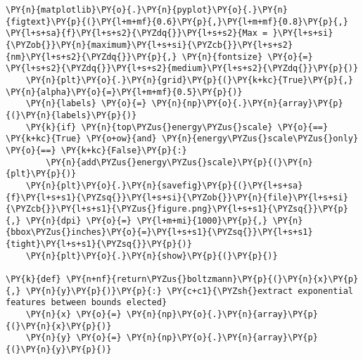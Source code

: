 \begin{tcolorbox}[breakable, size=fbox, boxrule=1pt, pad at break*=1mm,colback=cellbackground, colframe=cellborder]
\begin{Verbatim}[commandchars=\\\{\}]
    \PY{n}{matplotlib}\PY{o}{.}\PY{n}{pyplot}\PY{o}{.}\PY{n}{figtext}\PY{p}{(}\PY{l+m+mf}{0.6}\PY{p}{,}\PY{l+m+mf}{0.8}\PY{p}{,} \PY{l+s+sa}{f}\PY{l+s+s2}{\PYZdq{}}\PY{l+s+s2}{Max = }\PY{l+s+si}{\PYZob{}}\PY{n}{maximum}\PY{l+s+si}{\PYZcb{}}\PY{l+s+s2}{nm}\PY{l+s+s2}{\PYZdq{}}\PY{p}{,} \PY{n}{fontsize} \PY{o}{=} \PY{l+s+s2}{\PYZdq{}}\PY{l+s+s2}{medium}\PY{l+s+s2}{\PYZdq{}}\PY{p}{)}
    \PY{n}{plt}\PY{o}{.}\PY{n}{grid}\PY{p}{(}\PY{k+kc}{True}\PY{p}{,} \PY{n}{alpha}\PY{o}{=}\PY{l+m+mf}{0.5}\PY{p}{)}
    \PY{n}{labels} \PY{o}{=} \PY{n}{np}\PY{o}{.}\PY{n}{array}\PY{p}{(}\PY{n}{labels}\PY{p}{)}
    \PY{k}{if} \PY{n}{top\PYZus{}energy\PYZus{}scale} \PY{o}{==} \PY{k+kc}{True} \PY{o+ow}{and} \PY{n}{energy\PYZus{}scale\PYZus{}only} \PY{o}{==} \PY{k+kc}{False}\PY{p}{:}
        \PY{n}{add\PYZus{}energy\PYZus{}scale}\PY{p}{(}\PY{n}{plt}\PY{p}{)}
    \PY{n}{plt}\PY{o}{.}\PY{n}{savefig}\PY{p}{(}\PY{l+s+sa}{f}\PY{l+s+s1}{\PYZsq{}}\PY{l+s+si}{\PYZob{}}\PY{n}{file}\PY{l+s+si}{\PYZcb{}}\PY{l+s+s1}{\PYZus{}figure.png}\PY{l+s+s1}{\PYZsq{}}\PY{p}{,} \PY{n}{dpi} \PY{o}{=} \PY{l+m+mi}{1000}\PY{p}{,} \PY{n}{bbox\PYZus{}inches}\PY{o}{=}\PY{l+s+s1}{\PYZsq{}}\PY{l+s+s1}{tight}\PY{l+s+s1}{\PYZsq{}}\PY{p}{)}
    \PY{n}{plt}\PY{o}{.}\PY{n}{show}\PY{p}{(}\PY{p}{)}
    
\PY{k}{def} \PY{n+nf}{return\PYZus{}boltzmann}\PY{p}{(}\PY{n}{x}\PY{p}{,} \PY{n}{y}\PY{p}{)}\PY{p}{:} \PY{c+c1}{\PYZsh{}extract exponential features between bounds elected}
    \PY{n}{x} \PY{o}{=} \PY{n}{np}\PY{o}{.}\PY{n}{array}\PY{p}{(}\PY{n}{x}\PY{p}{)}
    \PY{n}{y} \PY{o}{=} \PY{n}{np}\PY{o}{.}\PY{n}{array}\PY{p}{(}\PY{n}{y}\PY{p}{)}
    

\end{Verbatim}
\end{tcolorbox}
